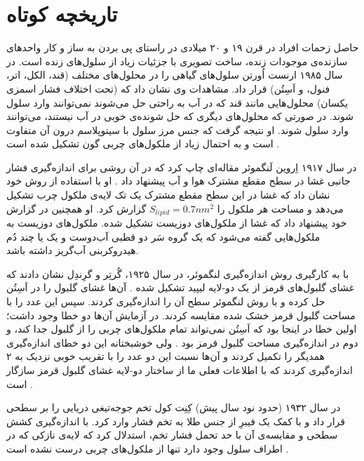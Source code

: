\setRL
\section{
تاریخچه کوتاه
}
حاصل زحمات افراد در قرن ۱۹ و ۲۰ میلادی در راستای پی بردن به ساز و کار واحد‌های سازنده‌ی موجودات زنده، ساخت تصویری با جزئیات زیاد از سلول‌های زنده است. در سال ۱۹۸۵ ارنست اُورتن  
سلول‌های گیاهی را در محلول‌های مختلف (قند،‌ الکل، اتر، فنول، و اَسِتُن) قرار داد. مشاهدات وی نشان داد که (تحت اختلاف فشار اسمزی یکسان) محلول‌هایی مانند قند که در آب به راحتی حل می‌شوند نمی‌توانند وارد سلول شوند. در صورتی که محلول‌های دیگری که حل شونده‌ی خوبی در آب نیستند، می‌توانند وارد سلول شوند. او نتیجه گرفت که جنس مرز سلول با سیتوپلاسم درون آن متفاوت است و به احتمال زیاد از ملکول‌های چربی گون تشکیل شده است
\cite{overton1985}.

در سال ۱۹۱۷ اِروین لَنگموئر 
 مقاله‌ای چاپ کرد که در آن روشی برای اندازه‌گیری فشار جانبی
 غشا در سطح مقطع مشترک هوا و آب پیشنهاد داد
 \cite{Langmuir1917}.
 او با استفاده از روش خود نشان داد که غشا در این سطح مقطع مشترک یک تک لایه‌ی ملکول چرب تشکیل می‌دهد و مساحت هر ملکول را 
 $S_{lipid} = 0.7 nm^2$
 گزارش کرد. او همچنین در گزارش خود پیشنهاد داد که غشا از ملکول‌های دوزیست
 تشکیل شده. ملکول‌های دوزیست به ملکول‌هایی گفته می‌شود که یک گروه سَر دو قطبی آب‌دوست و یک یا چند دُم هیدروکربنی آب‌گریز داشته باشد. 
 
 با به کارگیری روش اندازه‌گیری لنگموئر، در سال ۱۹۲۵، گُرتِر
 و گرِندِل
 نشان دادند که  غشای گلبول‌های قرمز از یک دو-لایه لیپید تشکیل شده
 \cite{Gorter1925}.
 آن‌ها غشای گلبول را در اَسِتُن حل کرده و با روش لنگموئر سطح آن را اندازه‌گیری کردند. سپس این عدد را با مساحت گلبول قرمز خشک شده مقایسه کردند. در آزمایش آن‌ها دو خطا وجود داشت؛ اولین خطا در اینجا بود که اَسِتُن نمی‌تواند تمام ملکول‌های چربی را از گلبول جدا کند، و دوم در اندازه‌گیری مساحت گلبول قرمز بود
 \cite{BiomembranesBook1989,BioMemBook2007}.
 ولی خوشبختانه این دو خطای اندازه‌گیری همدیگر را تکمیل کردند و آن‌ها نسبت این دو عدد را با تقریب خوبی نزدیک به ۲ اندازه‌گیری کردند که با اطلاعات فعلی ما از ساختار  دو-لایه غشای گلبول قرمز سازگار است
 \cite{Edidin2003}.
 
  
 
 
 در سال ۱۹۳۲ (حدود نود سال پیش) کِنِت کول
 تخم جوجه‌تیغی دریایی 
را بر سطحی قرار داد و  با کمک یک فیبرِ از جنس طلا به تخم  فشار وارد کرد. با اندازه‌گیری  کشش سطحی و مقایسه‌ی آن با حد تحمل فشار تخم، استدلال کرد که لایه‌ی نازکی که در اطراف سلول وجود دارد تنها از ملکول‌های چربی درست نشده است
 \cite{Cole1932}. 

